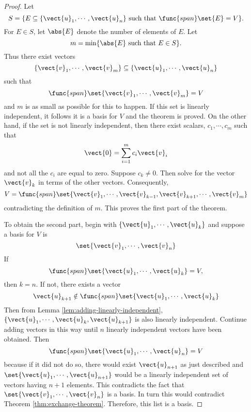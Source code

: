 \begin{proof}Let 
\begin{equation*}
S=\{E\subseteq \{\vect{u}_{1},\cdots ,\vect{u}_{n}\}\text{ such that }%
\func{span}\set{E} =V\}.
\end{equation*}
For $E\in S$, let $\abs{E}$ denote the number of elements
of $E$. Let 
\begin{equation*}
m= \min \{\abs{E}\text{ such that }E\in S\}.
\end{equation*}
Thus there exist vectors 
\begin{equation*}
\{\vect{v}_{1},\cdots ,\vect{v}_{m}\}\subseteq \{\vect{u}_{1},\cdots ,%
\vect{u}_{n}\}
\end{equation*}
such that 
\begin{equation*}
\func{span}\set{\vect{v}_{1},\cdots ,\vect{v}_{m}} =V
\end{equation*}
and $m$ is as small as possible for this to happen. If this set is linearly
independent, it follows it is a basis for $V$ and the theorem is proved. On
the other hand, if the set is not linearly independent, then there exist
scalars, $c_{1},\cdots ,c_{m}$ such that 
\begin{equation*}
\vect{0}=\sum_{i=1}^{m}c_{i}\vect{v}_{i}
\end{equation*}
and not all the $c_{i}$ are equal to zero. Suppose $c_{k}\neq 0$. Then solve for the
vector $\vect{v}_{k}$ in terms of the other vectors.
Consequently, 
\begin{equation*}
V=\func{span}\set{\vect{v}_{1},\cdots ,\vect{v}_{k-1},\vect{v}
_{k+1},\cdots ,\vect{v}_{m}}
\end{equation*}
contradicting the definition of $m$. This proves the first part of the
theorem.

To obtain the second part, begin with $\{\vect{u}_{1},\cdots ,\vect{u}
_{k}\}$ and suppose a basis for $V$ is 
\begin{equation*}
\set{\vect{v}_{1},\cdots ,\vect{v}_{n}} 
\end{equation*}
If 
\begin{equation*}
\func{span}\set{\vect{u}_{1},\cdots ,\vect{u}_{k}} =V,
\end{equation*}
then $k=n$. If not, there exists a vector 
\begin{equation*}
\vect{u}_{k+1}\notin \func{span}\set{\vect{u}_{1},\cdots ,\vect{u}
_{k}}
\end{equation*}
Then from Lemma \ref{lem:adding-linearly-independent}, $\{\vect{u}_{1},\cdots ,\vect{u}_{k},
\vect{u}_{k+1}\}$ is also linearly independent. Continue adding vectors in
this way until $n$ linearly independent vectors have been obtained. Then 
\begin{equation*}
\func{span}\set{\vect{u}_{1},\cdots ,\vect{u}_{n}} =V
\end{equation*}
because if it did not do so, there would exist $\vect{u}_{n+1}$ as just
described and $\set{\vect{u}_{1},\cdots ,\vect{u}_{n+1}} $
would be a linearly independent set of vectors having $n+1$ elements. This contradicts the fact that $\set{\vect{v}_{1},\cdots ,\vect{v}_{n}} $ is a basis.
 In turn this would contradict Theorem \ref{thm:exchange-theorem}. Therefore, this list is a
basis. 
\end{proof}

